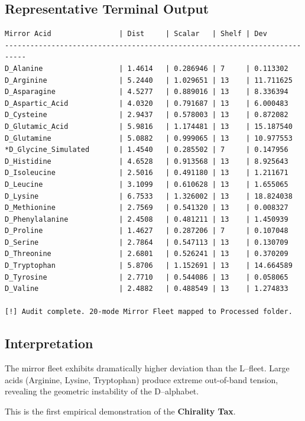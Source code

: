 \documentclass[11pt, letterpaper, openany]{book}
\begin{document}
\subsection*{Representative Terminal Output}
\begin{lstlisting}[style=terminal]
Mirror Acid                | Dist     | Scalar   | Shelf | Dev
---------------------------------------------------------------------------
D_Alanine                  | 1.4614   | 0.286946 | 7     | 0.113302
D_Arginine                 | 5.2440   | 1.029651 | 13    | 11.711625
D_Asparagine               | 4.5277   | 0.889016 | 13    | 8.336394
D_Aspartic_Acid            | 4.0320   | 0.791687 | 13    | 6.000483
D_Cysteine                 | 2.9437   | 0.578003 | 13    | 0.872082
D_Glutamic_Acid            | 5.9816   | 1.174481 | 13    | 15.187540
D_Glutamine                | 5.0882   | 0.999065 | 13    | 10.977553
*D_Glycine_Simulated       | 1.4540   | 0.285502 | 7     | 0.147956
D_Histidine                | 4.6528   | 0.913568 | 13    | 8.925643
D_Isoleucine               | 2.5016   | 0.491180 | 13    | 1.211671
D_Leucine                  | 3.1099   | 0.610628 | 13    | 1.655065
D_Lysine                   | 6.7533   | 1.326002 | 13    | 18.824038
D_Methionine               | 2.7569   | 0.541320 | 13    | 0.008327
D_Phenylalanine            | 2.4508   | 0.481211 | 13    | 1.450939
D_Proline                  | 1.4627   | 0.287206 | 7     | 0.107048
D_Serine                   | 2.7864   | 0.547113 | 13    | 0.130709
D_Threonine                | 2.6801   | 0.526241 | 13    | 0.370209
D_Tryptophan               | 5.8706   | 1.152691 | 13    | 14.664589
D_Tyrosine                 | 2.7710   | 0.544086 | 13    | 0.058065
D_Valine                   | 2.4882   | 0.488549 | 13    | 1.274833

[!] Audit complete. 20-mode Mirror Fleet mapped to Processed folder.
\end{lstlisting}

\subsection*{Interpretation}

The mirror fleet exhibits dramatically higher deviation than the L–fleet. Large
acids (Arginine, Lysine, Tryptophan) produce extreme out-of-band tension,
revealing the geometric instability of the D–alphabet.

This is the first empirical demonstration of the \textbf{Chirality Tax}.

\end{document}
